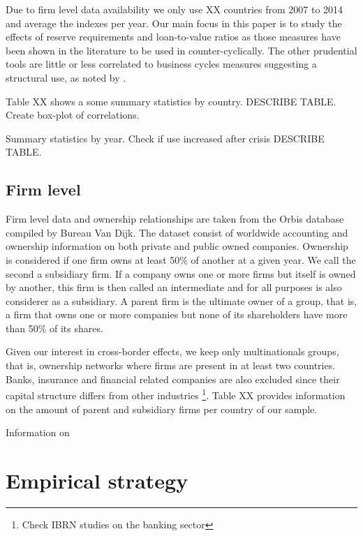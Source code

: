 \documentclass[12pt]{article}
\begin{document}
	Due to firm level data availability we only use XX countries from 2007 to 2014 and average the indexes per year. Our main focus in this paper is to study the effects of reserve requirements and loan-to-value ratios as those measures have been shown in the literature to be used in counter-cyclically. The other prudential tools are little or less correlated to business cycles measures suggesting a structural use, as noted by \cite{cerutti2016changes}. 
	
	Table XX shows a some summary statistics by country. DESCRIBE TABLE. Create box-plot of correlations.
	

	
    Summary statistics by year. Check if use increased after crisis DESCRIBE TABLE.
    
	\subsection{Firm level} \label{subsec:firm}
	Firm level data and ownership relationships are taken from the Orbis database compiled by Bureau Van Dijk.	The dataset consist of worldwide accounting and ownership information on both private and public owned companies. Ownership is considered if one firm owns at least 50\% of another at a given year. We call the second a subsidiary firm. If a company owns one or more firms but itself is owned by another, this firm is then called an intermediate and for all purposes is also considerer as a subsidiary. A parent firm is the ultimate owner of a group, that is, a firm that owns one or more companies but none of its shareholders have more than 50\% of its shares.
	
	Given our interest in cross-border effects, we keep only multinationals groups, that is, ownership networks where firms are present in at least two countries. Banks, insurance and financial related companies are also excluded since their capital structure differs from other industries \footnote{Check IBRN studies on the banking sector}. Table XX provides information on the amount of parent and subsidiary firms per country of our sample.
	
	Information on   
	\section{Empirical strategy} \label{sec:strategy}
	
\end{document}
